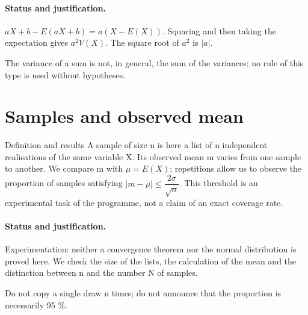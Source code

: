 \paragraph{Status and justification.} $aX+b-E(aX+b)=a(X-E(X))$. Squaring and then taking the expectation gives $a^2V(X)$. The square root of $a^2$ is $|a|$.
\label{C08-EX4}
\begin{erreur}The variance of a sum is not, in general, the sum of the variances; no rule of this type is used without hypotheses.\end{erreur}
\label{C08-AP4}
\section{Samples and observed mean}\label{C08-U5}
\begin{repere}{Definition and results}
A sample of size n is here a list of n independent realisations of the same variable X. Its observed mean m varies from one sample to another. We compare m with $\mu=E(X)$; repetitions allow us to observe the proportion of samples satisfying $|m-\mu|\leq \dfrac{2\sigma}{\sqrt n}$. This threshold is an experimental task of the programme, not a claim of an exact coverage rate.
\end{repere}
\paragraph{Status and justification.} Experimentation: neither a convergence theorem nor the normal distribution is proved here. We check the size of the lists, the calculation of the mean and the distinction between n and the number N of samples.
\label{C08-EX5}
\begin{erreur}Do not copy a single draw n times; do not announce that the proportion is necessarily 95 \%.\end{erreur}
\label{C08-AP5}
